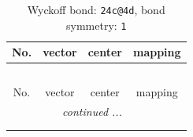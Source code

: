\documentclass[fleqn,8pt]{jsarticle}
\begin{document}
\renewcommand{\arraystretch}{1.2}
\begin{longtable}{cccc}
\caption{Wyckoff bond: {\tt 24c@4d}, bond symmetry: {\tt 1}}
 \\
 \hline \hline
No. & vector & center & mapping \\ \hline \endfirsthead

\multicolumn{3}{l}{\tablename\ \thetable{}} \\
 \hline \hline
No. & vector & center & mapping \\ \hline \endhead

 \hline \hline
\multicolumn{3}{r}{\footnotesize\it continued ...} \\ \endfoot

 \hline \hline
\multicolumn{3}{r}{} \\ \endlastfoot


\end{longtable}
\end{document}
